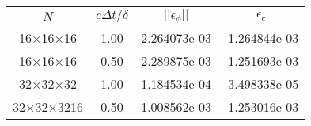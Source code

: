 \begin{tabular}{cccc}
     $N$ & $c\Delta t/\delta$  & $||\epsilon_{\phi}||$ & $\epsilon_{c}$  \\
16$\times$16$\times$16 & 1.00 & 2.264073e-03 & -1.264844e-03  \\
16$\times$16$\times$16 & 0.50 & 2.289875e-03 & -1.251693e-03  \\
32$\times$32$\times$32 & 1.00 & 1.184534e-04 & -3.498338e-05  \\
32$\times$32$\times$3216 & 0.50 & 1.008562e-03 & -1.253016e-03  \\
\end{tabular}
